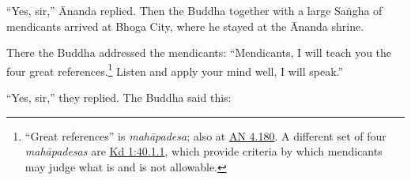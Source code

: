 \documentclass[12pt,openany]{book}%
\begin{document}
“Yes, sir,” Ānanda replied. Then the Buddha together with a large \textsanskrit{Saṅgha} of mendicants arrived at Bhoga City, where he stayed at the Ānanda shrine. 

There the Buddha addressed the mendicants: “Mendicants, I will teach you the four great references.\footnote{“Great references” is \textit{\textsanskrit{mahāpadesa}}; also at \href{https://suttacentral.net/an4.180/en/sujato}{AN 4.180}. A different set of four \textit{\textsanskrit{mahāpadesas}} are \href{https://suttacentral.net/pli-tv-kd1/en/sujato\#40.1.1}{Kd 1:40.1.1}, which provide criteria by which mendicants may judge what is and is not allowable. } Listen and apply your mind well, I will speak.” 

“Yes, sir,” they replied. The Buddha said this: 
\end{document}
